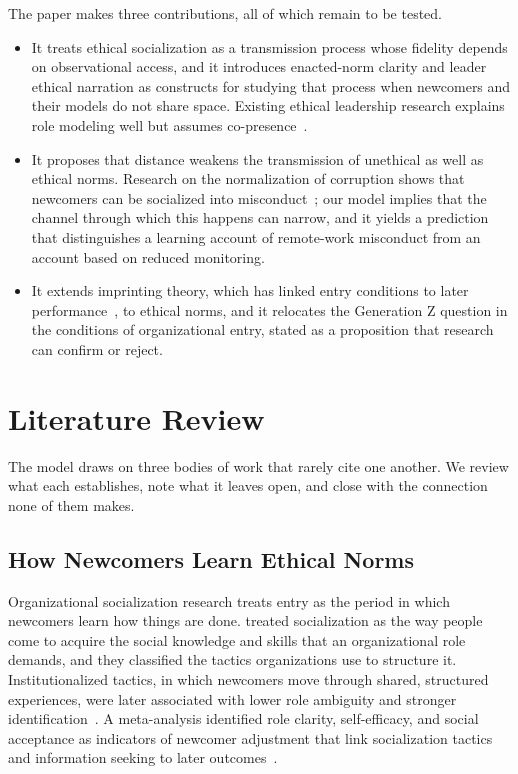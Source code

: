 \documentclass[12pt,a4paper]{article}
\theoremstyle{definition}
\begin{document}
The paper makes three contributions, all of which remain to be tested.

\begin{itemize}
\item It treats ethical socialization as a transmission process whose fidelity depends on observational access, and it introduces enacted-norm clarity and leader ethical narration as constructs for studying that process when newcomers and their models do not share space. Existing ethical leadership research explains role modeling well but assumes co-presence~\citep{brown2005ethical}.
\item It proposes that distance weakens the transmission of unethical as well as ethical norms. Research on the normalization of corruption shows that newcomers can be socialized into misconduct~\citep{ashforth2003normalization}; our model implies that the channel through which this happens can narrow, and it yields a prediction that distinguishes a learning account of remote-work misconduct from an account based on reduced monitoring.
\item It extends imprinting theory, which has linked entry conditions to later performance~\citep{tilcsik2014imprint}, to ethical norms, and it relocates the Generation Z question in the conditions of organizational entry, stated as a proposition that research can confirm or reject.
\end{itemize}

\section{Literature Review}
The model draws on three bodies of work that rarely cite one another. We review what each establishes, note what it leaves open, and close with the connection none of them makes.

\subsection{How Newcomers Learn Ethical Norms}

Organizational socialization research treats entry as the period in which newcomers learn how things are done. \citet{vanmaanen1979toward} treated socialization as the way people come to acquire the social knowledge and skills that an organizational role demands, and they classified the tactics organizations use to structure it. Institutionalized tactics, in which newcomers move through shared, structured experiences, were later associated with lower role ambiguity and stronger identification~\citep{ashforth1996socialization}. A meta-analysis identified role clarity, self-efficacy, and social acceptance as indicators of newcomer adjustment that link socialization tactics and information seeking to later outcomes~\citep{bauer2007newcomer}.
\end{document}
